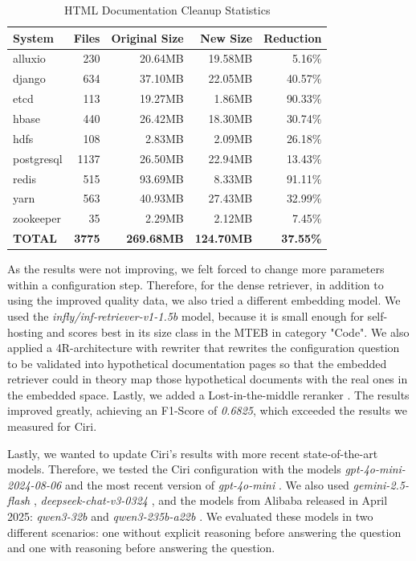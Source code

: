 \begin{table}[h]
    \centering
    \begin{tabular}{|l|r|r|r|r|}
        \hline
        \textbf{System} & \textbf{Files} & \textbf{Original Size} & \textbf{New Size} & \textbf{Reduction} \\
        \hline
        alluxio & 230 & 20.64MB & 19.58MB & 5.16\% \\
        django & 634 & 37.10MB & 22.05MB & 40.57\% \\
        etcd & 113 & 19.27MB & 1.86MB & 90.33\% \\
        hbase & 440 & 26.42MB & 18.30MB & 30.74\% \\
        hdfs & 108 & 2.83MB & 2.09MB & 26.18\% \\
        postgresql & 1137 & 26.50MB & 22.94MB & 13.43\% \\
        redis & 515 & 93.69MB & 8.33MB & 91.11\% \\
        yarn & 563 & 40.93MB & 27.43MB & 32.99\% \\
        zookeeper & 35 & 2.29MB & 2.12MB & 7.45\% \\
        \hline
        \textbf{TOTAL} & \textbf{3775} & \textbf{269.68MB} & \textbf{124.70MB} & \textbf{37.55\%} \\
        \hline
    \end{tabular}
    \caption{HTML Documentation Cleanup Statistics}
    \label{tab:cleanup_stats}
\end{table}

As the results were not improving, we felt forced to change more parameters within a configuration step. Therefore, for the dense retriever, in addition to using the improved quality data, we also tried a different embedding model. We used the \textit{infly/inf-retriever-v1-1.5b} \cite{inflyai2025} model, because it is small enough for self-hosting and scores best in its size class in the MTEB \cite{muennighoff2022mteb} \cite{MTEB} in category "Code". We also applied a 4R-architecture with rewriter that rewrites the configuration question to be validated into hypothetical documentation pages so that the embedded retriever could in theory map those hypothetical documents with the real ones in the embedded space. Lastly, we added a Lost-in-the-middle reranker \cite{Liu.06.07.2023}. The results improved greatly, achieving an F1-Score of \textit{0.6825}, which exceeded the results we measured for Ciri. 


Lastly, we wanted to update Ciri's results with more recent state-of-the-art models. Therefore, we tested the Ciri configuration with the models \textit{gpt-4o-mini-2024-08-06} and the most recent version of \textit{gpt-4o-mini} \cite{OpenAI_2022}. We also used \textit{gemini-2.5-flash} \cite{gemini-2.0}, \textit{deepseek-chat-v3-0324} \cite{deepseekai2024deepseekv3technicalreport}, and the models from Alibaba released in April 2025: \textit{qwen3-32b} and \textit{qwen3-235b-a22b} \cite{qwen3}. We evaluated these models in two different scenarios: one without explicit reasoning before answering the question and one with reasoning before answering the question. 

